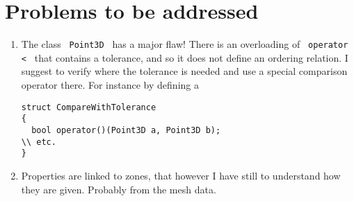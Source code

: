 \documentclass{article}
\newcommand{\li}{\lstinline}
\newcommand{\cpp}[1]{\li! #1 !}
\begin{document}
\section{Problems to be addressed}
\begin{enumerate}
\item The class \cpp{Point3D} has a major flaw! There is an overloading of \cpp{operator <} that contains a tolerance, and so it does not define
an ordering relation. I suggest to verify where the tolerance is needed and use a special comparison operator there. For instance by defining a
\begin{lstlisting}
struct CompareWithTolerance
{
  bool operator()(Point3D a, Point3D b);
\\ etc.
}
\end{lstlisting}
\item Properties are linked to zones, that however I have still to understand how they are given. Probably from the mesh data.
\end{enumerate}
\end{document}

